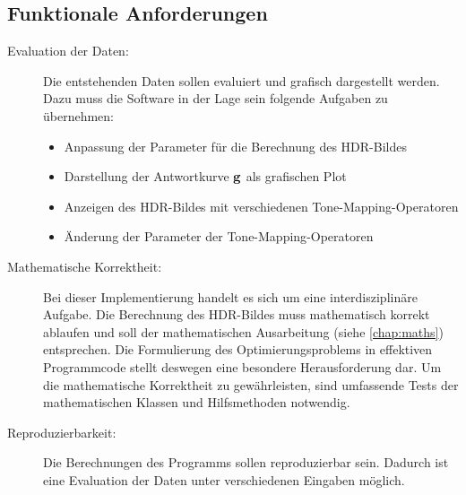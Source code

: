 \subsection{Funktionale Anforderungen}
\label{fa}
\begin{description}
\item[Evaluation der Daten:] Die entstehenden Daten sollen evaluiert und grafisch dargestellt werden. Dazu muss die Software in der Lage sein folgende Aufgaben zu übernehmen: 
    \begin{itemize}
        \item Anpassung der Parameter für die Berechnung des \gls{HDR}-Bildes
        \item Darstellung der Antwortkurve $\mathbf g$ als grafischen Plot
        \item Anzeigen des \gls{HDR}-Bildes mit verschiedenen \gls{Tone-Mapping}-Operatoren
        \item Änderung der Parameter der \gls{Tone-Mapping}-Operatoren
    \end{itemize}
    
\item[Mathematische Korrektheit:] Bei dieser Implementierung handelt es sich um eine interdisziplinäre Aufgabe. Die Berechnung des \gls{HDR}-Bildes muss mathematisch korrekt ablaufen und soll der mathematischen Ausarbeitung (siehe \autoref{chap:maths}) entsprechen. Die Formulierung des Optimierungsproblems in effektiven Programmcode stellt deswegen eine besondere Herausforderung dar. Um die mathematische Korrektheit zu gewährleisten, sind umfassende Tests der mathematischen Klassen und Hilfsmethoden notwendig.

\item[Reproduzierbarkeit:] Die Berechnungen des Programms sollen reproduzierbar sein. Dadurch ist eine Evaluation der Daten unter verschiedenen Eingaben möglich.

\end{description}


